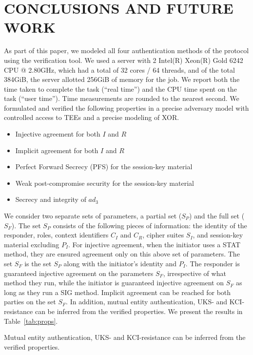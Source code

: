 \documentclass[runningheads]{llncs}
\newcommand{\mConstStyle}[1]{\textsf{#1}}
\newcommand{\mMethodStyle}[1]{\mConstStyle{#1}}
\newcommand{\mProtocolStyle}[1]{\text{#1}}
\newcommand{\mTamarin}{\mProtocolStyle{Tamarin}}
\newcommand{\mEdhoc}{\mProtocolStyle{EDHOC}}
\newcommand{\mStat}{\mMethodStyle{STAT}}
\newcommand{\mSig}{\mMethodStyle{SIG}}
\newcommand{\mXor}{\mConstStyle{XOR}}
\newcommand{\mSuites}{\ensuremath{S_I}}
\newcommand{\mCi}{\ensuremath{C_I}}
\newcommand{\mCr}{\ensuremath{C_R}}
\newcommand{\mADthree}{\ensuremath{\mathit{ad}_3}}
\begin{document}
\section{\uppercase{Conclusions and Future Work}}
\label{sec:conclusion}
As part of this paper, we modeled all four authentication methods of the
\mEdhoc{} protocol using the \mTamarin{} verification tool.
%
We used a server with 2 Intel(R) Xeon(R) Gold 6242 CPU @ 2.80GHz, which had a
total of 32 cores / 64 threads, and of the total 384GiB, the server allotted
256GiB of memory for the \mTamarin{} job.
%
We report both the time taken to complete the task (``real time'') and the CPU
time spent on the task (``user time'').
%
Time measurements are rounded to the nearest second.
%
We formulated and verified the following properties in a precise adversary model
with controlled access to TEEs and a precise modeling of \mXor.
%
\begin{itemize}
\item Injective agreement for both $I$ and $R$
\item Implicit agreement for both $I$ and $R$
\item Perfect Forward Secrecy (PFS) for the session-key material
\item Weak post-compromise security for the session-key material
\item Secrecy and integrity of \mADthree{}
\end{itemize}
%
We consider two separate sets of parameters, a partial set ($S_P$) and the full
set ($S_F$).
%
The set $S_P$ consists of the following pieces of information: the identity of
the responder, roles, context identifiers \mCi{} and \mCr, cipher suites
\mSuites, and session-key material excluding $P_I$.
%
For injective agreement, when the initiator uses a \mStat{} method, they are
ensured agreement only on this above set of parameters.
%
The set $S_F$ is the set $S_P$ along with the initiator's identity and $P_I$.
%
The responder is guaranteed injective agreement on the parameters $S_F$,
irrespective of what method they run, while the initiator is guaranteed
injective agreement on $S_F$ as long as they run a \mSig{} method.
%
Implicit agreement can be reached for both parties on the set $S_F$.
%
In addition, mutual entity authentication, UKS- and KCI-resistance can be
inferred from the verified properties.
%
We present the results in Table~\ref{tab:props}.
%

Mutual entity authentication, UKS- and KCI-resistance can be inferred
from the verified properties.
%
\end{document}
